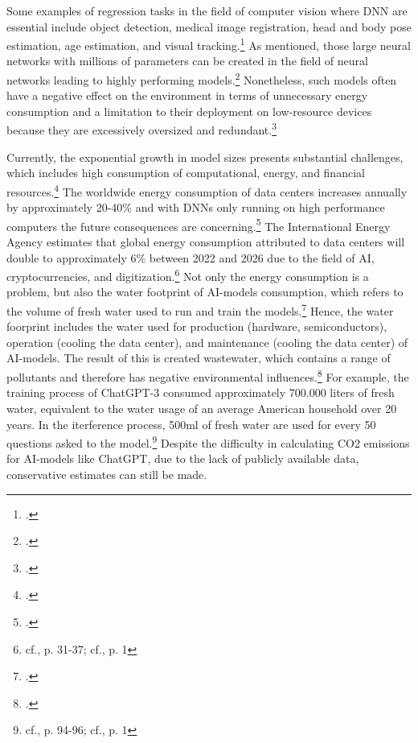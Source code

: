 Some examples of regression tasks in the field of computer vision where \ac{DNN} are essential include object detection, medical image registration, head and body pose estimation, age estimation, and visual tracking.\footcite[cf.][325-326]{gustafssonEnergyBasedModelsDeep2020}
As mentioned, those large neural networks with millions of parameters can be created in the field of neural networks leading to highly performing models.\footcite[cf.][152]{marinoDeepNeuralNetworks2023}
Nonetheless, such models often have a negative effect on the environment in terms of unnecessary energy consumption and a limitation to their deployment on low-resource devices because they are excessively oversized and redundant.\footcite[cf.][152]{marinoDeepNeuralNetworks2023}

Currently, the exponential growth in model sizes presents substantial challenges, which includes high consumption of computational, energy, and financial resources.\footcite[cf.][1-2]{baiEfficiencySystematicSurvey2024}
The worldwide energy consumption of data centers increases annually by approximately 20-40\% and with \ac{DNN}s only running on high performance computers the future
consequences are concerning.\footcite[cf.][1]{hintemannDataCenters20212022} 
The International Energy Agency estimates that global energy consumption attributed to data centers will double to approximately 6\% between 2022 and 2026 due to the field of AI, cryptocurrencies, and digitization.\footnote{cf.\cite{anon.Electricity2024Analysis2024}, p. 31-37; cf.\cite{jacksonAIBoomWill2024}, p. 1}
Not only the energy consumption is a problem, but also the water footprint of AI-models consumption, which refers to the volume of fresh water used to run and train the models.\footcite[cf.][92-93]{georgeEnvironmentalImpactAI2023}
Hence, the water foorprint includes the water used for production (hardware, semiconductors), operation (cooling the data center), and maintenance (cooling the data center) of AI-models.
The result of this is created wastewater, which contains a range of pollutants and therefore has negative environmental influences.\footcite[cf.][94-96]{georgeEnvironmentalImpactAI2023}
For example, the training process of ChatGPT-3 consumed approximately 700.000 liters of fresh water, equivalent to the water usage of an average American household over 20 years.
In the iterference process, 500ml of fresh water are used for every 50 questions asked to the model.\footnote{cf.\cite{georgeEnvironmentalImpactAI2023}, p. 94-96; cf.\cite{anon.AIProgramsConsume}, p. 1}
Despite the difficulty in calculating CO2 emissions for AI-models like ChatGPT, due to the lack of publicly available data, conservative estimates can still be made.
